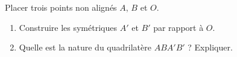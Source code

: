
\begin{exercice}\label{exo2smath-0172}

            Placer trois points non alignés \( A\), \( B\) et \( O\).
    \begin{enumerate}
        \item
            Construire les symétriques \( A'\) et \( B'\) par rapport à \( O\).
        \item
            Quelle est la nature du quadrilatère \( ABA'B'\) ? Expliquer.
    \end{enumerate}

\end{exercice}
